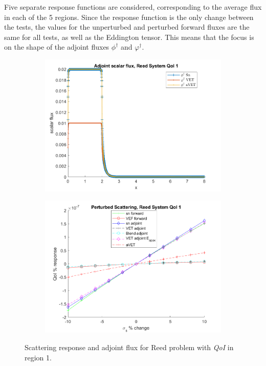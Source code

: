 \documentclass[12pt]{report}
\newcommand{\qoi}{{\it QoI}\xspace}
\begin{document}
Five separate response functions are considered, corresponding to the average flux in each of the 5 regions. Since the response function is the only change between the tests, the values for the unperturbed and perturbed forward fluxes are the same for all tests, as well as the Eddington tensor. This means that the focus is on the shape of the adjoint fluxes $\phi^\dag$ and $\varphi^\dag$.
\begin{figure}[H]
\centering
\begin{subfigure}{.5\textwidth}
  \centering
  \includegraphics[width=.98\linewidth]{figures2/770phia.png}
\end{subfigure}%
\begin{subfigure}{.5\textwidth}
  \centering
  \includegraphics[width=.98\linewidth]{figures2/770sigsSens.png}
\end{subfigure}
\caption{Scattering response and adjoint flux for Reed problem with \qoi in region 1.}
\label{Reed1}
\end{figure}
\end{document}
